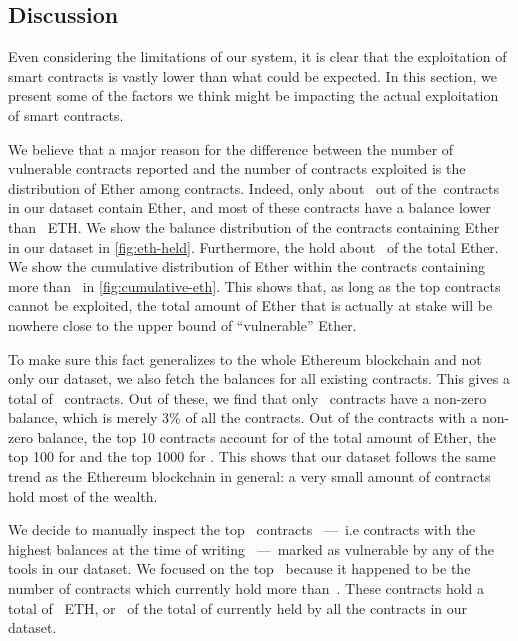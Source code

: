 \subsection{Discussion}
\label{sec:5a:discussion}

Even considering the limitations of our system, it is clear that the exploitation of smart contracts is vastly lower than what could be expected. In this section, we present some of the factors we think might be impacting the actual exploitation of smart contracts.


We believe that a major reason for the difference between the number of vulnerable contracts reported and the number of contracts exploited is the distribution of Ether among contracts. Indeed, only about~ out of the~\VulnerableContracts contracts in our dataset contain Ether, and most of these contracts have a balance lower than~ ETH.
We show the balance distribution of the contracts containing Ether in our dataset in \autoref{fig:eth-held}. Furthermore, the  hold about~ of the total Ether. We show the cumulative distribution of Ether within the contracts containing more than~ in \autoref{fig:cumulative-eth}. This shows that, as long as the top contracts cannot be exploited, the total amount of Ether that is actually at stake will be nowhere close to the upper bound of ``vulnerable'' Ether.

To make sure this fact generalizes to the whole Ethereum blockchain and not only our dataset, we also fetch the balances for all existing contracts. This gives a total of~ contracts. Out of these, we find that only~ contracts have a non-zero balance, which is merely 3\% of all the contracts. Out of the contracts with a non-zero balance, the top 10 contracts account for  of the total amount of Ether, the top 100 for  and the top 1000 for . This shows that our dataset follows the same trend as the Ethereum blockchain in general: a very small amount of contracts hold most of the wealth.

We decide to manually inspect the top~ contracts~ ---~i.e contracts with the highest balances at the time of writing~ ---~marked as vulnerable by any of the tools in our dataset. We focused on the top~ because it happened to be the number of contracts which currently hold more than~. These contracts hold a total of~ ETH, or~ of the total of  currently held by all the contracts in our dataset.

